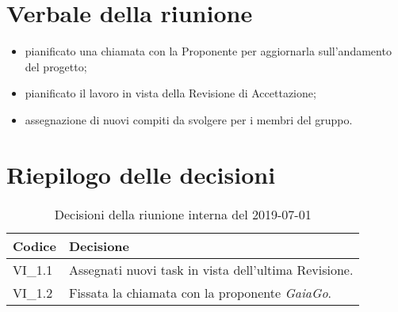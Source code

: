 \section{Verbale della riunione}
\begin{itemize}
	\item pianificato una chiamata con la Proponente per aggiornarla sull'andamento del progetto;
	\item pianificato il lavoro in vista della Revisione di Accettazione;
	\item assegnazione di nuovi compiti da svolgere per i membri del gruppo.
\end{itemize} 

\section{Riepilogo delle decisioni}

	
	\begin{longtable}{ >{\centering}p{} >{}p{}}
		\caption{Decisioni della riunione interna del 2019-07-01}\\	
		\rowcolorhead
		\textbf{\color{white}Codice} 
		& \centering\textbf{\color{white}Decisione} 
		\tabularnewline 
		\endfirsthead 
		VI\_1.1 & Assegnati nuovi task in vista dell'ultima Revisione.
		
		\tabularnewline 
		VI\_1.2 & Fissata la chiamata con la proponente \textit{GaiaGo}.
		
	\end{longtable}
	




